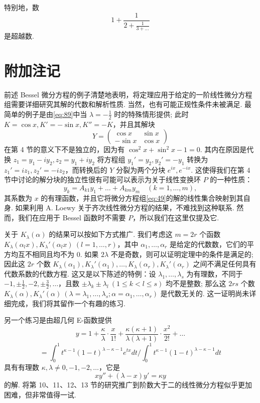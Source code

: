 特别地，数
\[1 + \frac{1}{2 + \frac{1}{3 + \dots}}\]
是超越数.

\section{附加注记}

前述 Bessel 微分方程的例子清楚地表明，将定理应用于给定的一阶线性微分方程组需要详细研究其解的代数和解析性质. 当然，也有可能正规性条件未被满足. 最简单的例子是由\eqref{eq:89}中当 $\lambda = -\frac{1}{2}$ 时的特殊情形提供; 此时 $K = \cos x, K' = -\sin x, K'' = -K$，并且其解块
\[Y = \begin{pmatrix} \cos x & \sin x \\ -\sin x & \cos x \end{pmatrix}\]
在第 4 节的意义下不是独立的，因为有 $\cos^2 x + \sin^2 x - 1 = 0$. 其内在原因是代换 $z_1 = y_1 - i y_2, z_2 = y_1 + i y_2$ 将方程组 $y_1' = y_2, y_2' = -y_1$ 转换为 $z_1' = i z_1, z_2' = -i z_2$，而转换后的 $Y$ 分裂为两个分块 $e^{ix}, e^{-ix}$. 这使得我们在第 4 节中讨论的解分块的独立性很有可能可以表示为关于线性变换环 $P$ 的一种性质：
\[y_k = A_{k1} y_1 + \dots + A_{km} y_m \quad (k=1,\dots,m),\]
其系数为 $x$ 的有理函数，并且它将微分方程组\eqref{eq:49}的解的线性集合映射到其自身. 如果利用 A. Loewy 关于齐次线性微分方程的结果，不难找到这种联系. 然而，我们在应用于 Bessel 函数时不需要 $P$，所以我们在这里仅提及它.

关于 $K_\lambda(\alpha)$ 的结果可以按如下方式推广. 我们考虑这 $m=2r$ 个函数 $K_\lambda(\alpha_l x), K_\lambda'(\alpha_l x) \ (l=1,\dots,r)$，其中 $\alpha_1, \dots, \alpha_r$ 是给定的代数数，它们的平方均互不相同且均不为 0. 如果 $2\lambda$ 不是奇数，则可以证明定理中的条件是满足的; 因此这 $2r$ 个数 $K_\lambda(\alpha_1), K_\lambda'(\alpha_1), \dots, K_\lambda(\alpha_r), K_\lambda'(\alpha_r)$ 之间不满足任何具有代数系数的代数方程. 这又是以下陈述的特例：设 $\lambda_1, \dots, \lambda_s$ 为有理数，不同于 $-1, \pm \frac{1}{2}, -2, \pm \frac{3}{2}, \dots$，且数 $\pm \lambda_k \pm \lambda_l \ (1 \le k < l \le s)$ 均不是整数; 那么这 $2rs$ 个数 $K_\lambda(\alpha), K_\lambda'(\alpha) \ (\lambda = \lambda_1, \dots, \lambda_s; \alpha = \alpha_1, \dots, \alpha_r)$ 是代数无关的. 这一证明尚未详细完成，我们将其留作一个有趣的练习.

另一个练习是由超几何 E-函数提供
\[y = 1 + \frac{\kappa}{\lambda} \cdot \frac{x}{1!} + \frac{\kappa(\kappa+1)}{\lambda(\lambda+1)} \cdot \frac{x^2}{2!} + \dots\]
\[= \int_0^1 t^{\kappa-1} (1-t)^{\lambda-\kappa-1} e^{tx} dt \Big/ \int_0^1 t^{\kappa-1} (1-t)^{\lambda-\kappa-1} dt\]
具有有理数 $\kappa, \lambda \neq 0, -1, -2, \dots$，它是
\[x y'' + (\lambda - x) y' = \kappa y\]
的解. 将第 10、11、12、13 节的研究推广到阶数大于二的线性微分方程似乎更加困难，但非常值得一试.
